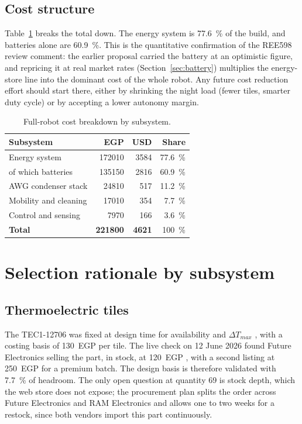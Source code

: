 \documentclass[11pt,a4paper]{article}
\begin{document}
\subsection{Cost structure}
Table~\ref{tab:share} breaks the total down. The energy system is
\SI{77.6}{\percent} of the build, and batteries alone are
\SI{60.9}{\percent}. This is the quantitative confirmation of the REE598
review comment: the earlier proposal carried the battery at an optimistic
figure, and repricing it at real market rates (Section~\ref{sec:battery})
multiplies the energy-store line into the dominant cost of the whole robot.
Any future cost reduction effort should start there, either by shrinking the
night load (fewer tiles, smarter duty cycle) or by accepting a lower
autonomy margin.

\begin{table}[h]
\centering
\caption{Full-robot cost breakdown by subsystem.}
\label{tab:share}
\begin{tabular}{@{}lrrr@{}}
\toprule
\textbf{Subsystem} & \textbf{EGP} & \textbf{USD} & \textbf{Share}\\
\midrule
Energy system          & \num{172010} & \num{3584} & \SI{77.6}{\percent}\\
\quad of which batteries & \num{135150} & \num{2816} & \SI{60.9}{\percent}\\
AWG condenser stack    & \num{24810}  & \num{517}  & \SI{11.2}{\percent}\\
Mobility and cleaning  & \num{17010}  & \num{354}  & \SI{7.7}{\percent}\\
Control and sensing    & \num{7970}   & \num{166}  & \SI{3.6}{\percent}\\
\midrule
\textbf{Total}         & \textbf{\num{221800}} & \textbf{\num{4621}} & \SI{100}{\percent}\\
\bottomrule
\end{tabular}
\end{table}

\section{Selection rationale by subsystem}

\subsection{Thermoelectric tiles}
The TEC1-12706 was fixed at design time for availability and
$\Delta T_{max}$ \cite{tec12706ds}, with a costing basis of \num{130}~EGP
per tile. The live check on 12 June 2026 found Future Electronics selling
the part, in stock, at \num{120}~EGP \cite{futelec2026tec}, with a second
listing at \num{250}~EGP for a premium batch. The design basis is therefore
validated with \SI{7.7}{\percent} of headroom. The only open question at
quantity 69 is stock depth, which the web store does not expose; the
procurement plan splits the order across Future Electronics and RAM
Electronics and allows one to two weeks for a restock, since both vendors
import this part continuously.
\end{document}
